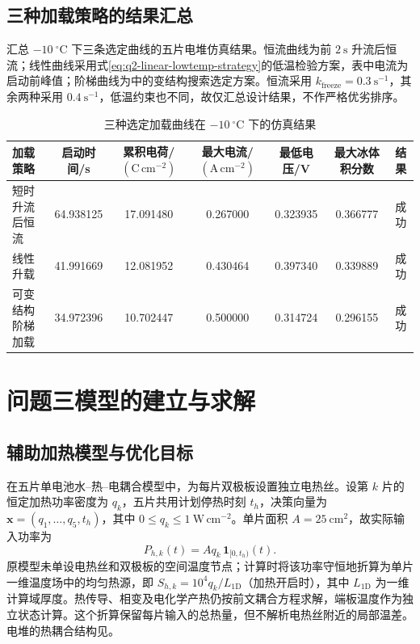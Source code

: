 \documentclass{gmcmthesis}
\begin{document}
\subsection{三种加载策略的结果汇总}

汇总 $-10~^{\circ}\mathrm{C}$ 下三条选定曲线的五片电堆仿真结果。恒流曲线为前 $2~\mathrm{s}$ 升流后恒流；线性曲线采用式\eqref{eq:q2-linear-lowtemp-strategy}的低温检验方案，表中电流为启动前峰值；阶梯曲线为中的变结构搜索选定方案。恒流采用 $k_{\mathrm{freeze}}=0.3~\mathrm{s^{-1}}$，其余两种采用 $0.4~\mathrm{s^{-1}}$，低温约束也不同，故仅汇总设计结果，不作严格优劣排序。

\begin{table}[H]
  \centering
  \caption{三种选定加载曲线在 $-10~^{\circ}\mathrm{C}$ 下的仿真结果}
  \label{tab:q2-strategy-summary}
  \footnotesize
  \setlength{\tabcolsep}{2.5pt}
  \begin{tabular}{lcccccc}
    \toprule
    加载策略 & 启动时间/s & 累积电荷/$(\mathrm{C\,cm^{-2}})$ & 最大电流/$(\mathrm{A\,cm^{-2}})$ & 最低电压/V & 最大冰体积分数 & 结果\\
    \midrule
    短时升流后恒流 & 64.938125 & 17.091480 & 0.267000 & 0.323935 & 0.366777 & 成功\\
    线性升载 & 41.991669 & 12.081952 & 0.430464 & 0.397340 & 0.339889 & 成功\\
    可变结构阶梯加载 & 34.972396 & 10.702447 & 0.500000 & 0.314724 & 0.296155 & 成功\\
    \bottomrule
  \end{tabular}
\end{table}

\section{问题三模型的建立与求解}
\label{sec:model3}

\subsection{辅助加热模型与优化目标}

在五片单电池水--热--电耦合模型中，为每片双极板设置独立电热丝。设第 $k$ 片的恒定加热功率密度为 $q_k$，五片共用计划停热时刻 $t_h$，决策向量为 $\bm x=(q_1,\ldots,q_5,t_h)$，其中 $0\le q_k\le1~\mathrm{W\,cm^{-2}}$。单片面积 $A=25~\mathrm{cm^2}$，故实际输入功率为
\begin{equation}
  P_{h,k}(t)=Aq_k\,\bm 1_{[0,t_h)}(t).
  \label{eq:q3-heater}
\end{equation}
原模型未单设电热丝和双极板的空间温度节点；计算时将该功率守恒地折算为单片一维温度场中的均匀热源，即 $S_{h,k}=10^4q_k/L_{\mathrm{1D}}$（加热开启时），其中 $L_{\mathrm{1D}}$ 为一维计算域厚度。热传导、相变及电化学产热仍按前文耦合方程求解，端板温度作为独立状态计算。这个折算保留每片输入的总热量，但不解析电热丝附近的局部温差。电堆的热耦合结构见。
\end{document}
